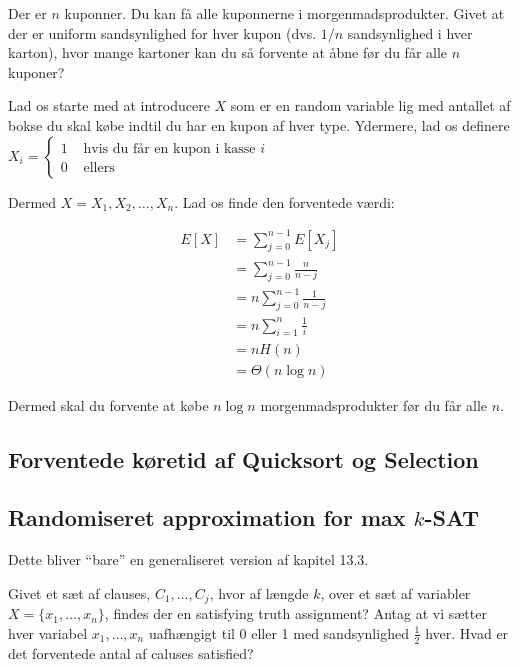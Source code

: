 \documentclass[11pt]{article}
\theoremstyle{definition}
\theoremstyle{remark}
\begin{document}
Der er $n$ kuponner. Du kan få alle kuponnerne i morgenmadsprodukter. Givet at der er uniform sandsynlighed for hver kupon (dvs. $1/n$ sandsynlighed i hver karton), hvor mange kartoner kan du så forvente at åbne før du får alle $n$ kuponer?

Lad os starte med at introducere $X$ som er en random variable lig med antallet af bokse du skal købe indtil du har en kupon af hver type. Ydermere, lad os definere $X_{i} = \begin{cases}
  1 & \text{ hvis du får en kupon i kasse }i\\
  0 & \text{ ellers}
\end{cases}$

Dermed $X = X_{1}, X_{2}, \ldots, X_{n}$. Lad os finde den forventede værdi:

\begin{equation}
\begin{split}
  E[X] &= \sum_{j=0}^{n-1}E[X_{j}]\\
       &= \sum_{j=0}^{n-1} \frac{n}{n-j}\\
       &= n \sum_{j=0}^{n-1} \frac{1}{n-j} \\
       &= n \sum_{i=1}^{n} \frac{1}{i} \\
       &= nH(n) \\
  &= \Theta(n \log n)
\end{split}
\end{equation}

Dermed skal du forvente at købe $n \log n$ morgenmadsprodukter før du får alle $n$. 

\subsection{Forventede køretid af Quicksort og Selection}
\label{subsec:label}


\subsection{Randomiseret approximation for max $k$-SAT}
\label{subsec:label}

Dette bliver ``bare'' en generaliseret version af kapitel 13.3.

Givet et sæt af clauses, $C_{1}, \ldots, C_{j}$, hvor af længde $k$, over et sæt af variabler $X = \{x_{1}, \ldots, x_{n}\}$, findes der en satisfying truth assignment?
Antag at vi sætter hver variabel $x_{1}, \ldots, x_{n}$ uafhængigt til 0 eller 1 med sandsynlighed $\frac{1}{2}$ hver. Hvad er det forventede antal af caluses satisfied?
\end{document}
